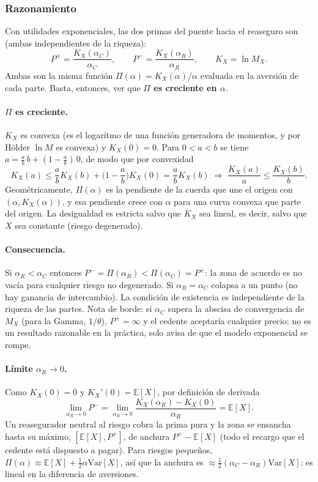 \documentclass[a4paper,12pt]{article}
\newcommand{\E}{\mathbb{E}}
\newcommand{\Var}{\mathrm{Var}}
\begin{document}
\subsubsection*{Razonamiento}
Con utilidades exponenciales, las dos primas del puente hacia el reaseguro son (ambas independientes de la riqueza):
\[
P^+=\frac{K_X(\alpha_C)}{\alpha_C},\qquad P^-=\frac{K_X(\alpha_R)}{\alpha_R},\qquad K_X=\ln M_X .
\]
Ambas son la misma funci\'on $\Pi(\alpha)=K_X(\alpha)/\alpha$ evaluada en la aversi\'on de cada parte. Basta, entonces, ver que \textbf{$\Pi$ es creciente en $\alpha$}.

\paragraph{$\Pi$ es creciente.} $K_X$ es convexa (es el logaritmo de una funci\'on generadora de momentos, y por Hölder $\ln M$ es convexa) y $K_X(0)=0$. Para $0<a<b$ se tiene $a=\tfrac ab\,b+(1-\tfrac ab)\,0$, de modo que por convexidad
\[
K_X(a)\le\frac ab K_X(b)+\Big(1-\frac ab\Big)K_X(0)=\frac ab K_X(b)\;\Longrightarrow\;\frac{K_X(a)}{a}\le\frac{K_X(b)}{b}.
\]
Geom\'etricamente, $\Pi(\alpha)$ es la pendiente de la cuerda que une el origen con $(\alpha,K_X(\alpha))$, y esa pendiente crece con $\alpha$ para una curva convexa que parte del origen. La desigualdad es estricta salvo que $K_X$ sea lineal, es decir, salvo que $X$ sea constante (riesgo degenerado).

\paragraph{Consecuencia.} Si $\alpha_R<\alpha_C$ entonces $P^-=\Pi(\alpha_R)<\Pi(\alpha_C)=P^+$: la zona de acuerdo es no vac\'ia para cualquier riesgo no degenerado. Si $\alpha_R=\alpha_C$ colapsa a un punto (no hay ganancia de intercambio). La condici\'on de existencia es independiente de la riqueza de las partes. Nota de borde: si $\alpha_C$ supera la abscisa de convergencia de $M_X$ (para la Gamma, $1/\theta$), $P^+=\infty$ y el cedente aceptar\'ia cualquier precio; no es un resultado razonable en la pr\'actica, solo avisa de que el modelo exponencial se rompe.

\paragraph{L\'imite $\alpha_R\to0$.} Como $K_X(0)=0$ y $K_X'(0)=\E[X]$, por definici\'on de derivada
\[
\lim_{\alpha_R\to0}P^-=\lim_{\alpha_R\to0}\frac{K_X(\alpha_R)-K_X(0)}{\alpha_R}=\E[X].
\]
Un reasegurador neutral al riesgo cobra la prima pura y la zona se ensancha hasta su m\'aximo, $[\E[X],P^+]$, de anchura $P^+-\E[X]$ (todo el recargo que el cedente est\'a dispuesto a pagar). Para riesgos peque\~nos, $\Pi(\alpha)\approx\E[X]+\tfrac12\alpha\Var[X]$, as\'i que la anchura es $\approx\tfrac12(\alpha_C-\alpha_R)\Var[X]$: es lineal en la diferencia de aversiones.
\end{document}

